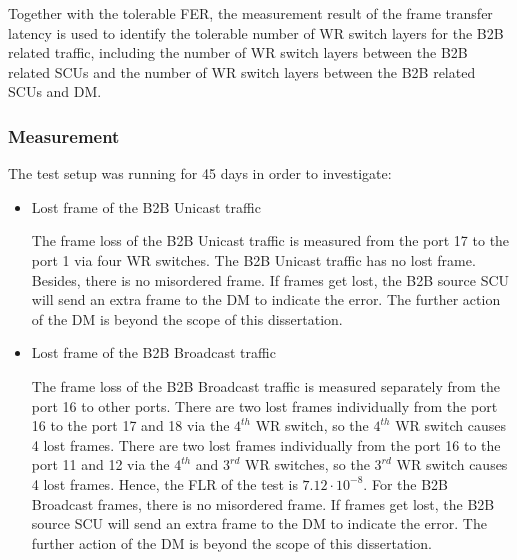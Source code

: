 Together with the tolerable FER, the measurement result of the frame transfer latency is used to identify the tolerable number of WR switch layers for the B2B related traffic, including the number of WR switch layers between the B2B related SCUs and the number of WR switch layers between the B2B related SCUs and DM. 


\subsubsection{Measurement}
The test setup was running for 45 days in order to investigate: 
\begin{itemize}
    \item Lost frame of the B2B Unicast traffic

The frame loss of the B2B Unicast traffic is measured from the port 17 to the port 1 via four WR switches. The B2B Unicast traffic has no lost frame. Besides, there is no misordered frame. If frames get lost, the B2B source SCU will send an extra frame to the DM to indicate the error. The further action of the DM is beyond the scope of this dissertation.

    \item Lost frame of the B2B Broadcast traffic

 


The frame loss of the B2B Broadcast traffic is measured separately from the port 16 to other ports. There are two lost frames individually from the port 16 to the port 17 and 18 via the $4^{th}$ WR switch, so the $4^{th}$ WR switch causes 4 lost frames.  There are two lost frames individually from the port 16 to the port 11 and 12 via the $4^{th}$ and $3^{rd}$ WR switches, so the $3^{rd}$ WR switch causes 4 lost frames. Hence, the FLR of the test is $7.12\cdot 10^{-8}$. For the B2B Broadcast frames, there is no misordered frame. If frames get lost, the B2B source SCU will send an extra frame to the DM to indicate the error. The further action of the DM is beyond the scope of this dissertation.



\end{itemize}
